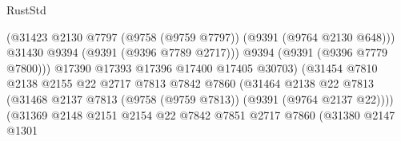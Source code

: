 \begin{lexlean}{RustStd}
\begin{coremodule}
                                                  (@31423
                                                    @2130
                                                    @7797
                                                    (@9758 (@9759 @7797))
                                                    (@9391 (@9764 @2130 @648)))
                                                  @31430
                                                  @9394
                                                  (@9391 (@9396 @7789 @2717)))
                                                @9394
                                                (@9391 (@9396 @7779 @7800)))
                                              @17390
                                              @17393
                                              @17396
                                              @17400
                                              @17405
                                              @30703)
                                            (@31454
                                              @7810
                                              @2138
                                              @2155
                                              @22
                                              @2717
                                              @7813
                                              @7842
                                              @7860
                                              (@31464
                                                @2138
                                                @22
                                                @7813
                                                (@31468
                                                  @2137
                                                  @7813
                                                  (@9758 (@9759 @7813))
                                                  (@9391 (@9764 @2137 @22))))
                                              (@31369
                                                @2148
                                                @2151
                                                @2154
                                                @22
                                                @7842
                                                @7851
                                                @2717
                                                @7860
                                                (@31380
                                                  @2147
                                                  @1301

\end{coremodule}
\end{lexlean}
